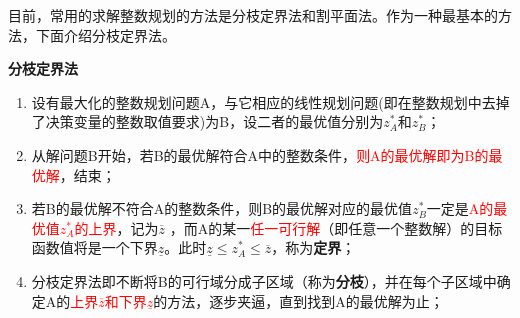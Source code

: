     目前，常用的求解整数规划的方法是分枝定界法和割平面法。作为一种最基本的方法，下面介绍分枝定界法。
    \begin{notebox}{\textbf{分枝定界法}}
        \\
        \begin{enumerate}
            \item 设有最大化的整数规划问题A，与它相应的线性规划问题(即在整数规划中去掉了决策变量的整数取值要求)为B，设二者的最优值分别为$z_A^*$和$z_B^*$；
            \item 从解问题B开始，若B的最优解符合A中的整数条件，\textcolor{red}{则A的最优解即为B的最优解}，结束；
            \item 若B的最优解不符合A的整数条件，则B的最优解对应的最优值$z_B^*$一定是\textcolor{red}{A的最优值$z_A^*$的上界}，记为$\overline{z}$ ，而A的某一\textcolor{red}{任一可行解}（即任意一个整数解）的目标函数值将是一个下界$\underline{z}$。此时$\underline{z}\leq z_A^* \leq \overline{z}$，称为\textbf{定界}；
            \item 分枝定界法即不断将B的可行域分成子区域（称为\textbf{分枝}），并在每个子区域中确定A的\textcolor{red}{上界$\overline{z}$和下界$\underline{z}$}的方法，逐步夹逼，直到找到A的最优解为止；
        \end{enumerate}
    \end{notebox}

